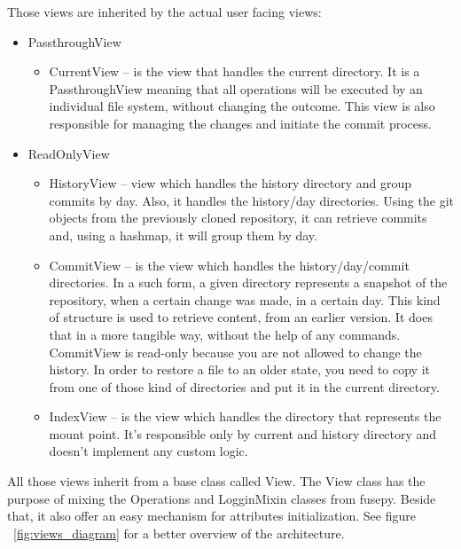 Those views are inherited by the actual user facing views:
\begin{itemize}
    \item PassthroughView
    \begin{itemize}
        \item CurrentView – is the view that handles the current directory. It is a PassthroughView meaning that all operations will be executed by an individual file system, without changing the outcome. This view is also responsible for managing the changes and initiate the commit process.
    \end{itemize}
    
    \item ReadOnlyView
    \begin{itemize}
        \item HistoryView – view which handles the history directory and group commits by day. Also, it handles the history/{day} directories. Using the git objects from the previously cloned repository, it can retrieve commits and, using a hashmap, it will group them by day.
        \item CommitView – is the view which handles the history/{day}/{commit} directories. In a such form, a given directory represents a snapshot of the repository, when a certain change was made, in a certain day. This kind of structure is used to retrieve content, from an earlier version. It does that in a more tangible way, without the help of any commands. CommitView is read-only because you are not allowed to change the history. In order to restore a file to an older state, you need to copy it from one of those kind of directories and put it in the current directory.
        \item IndexView – is the view which handles the directory that represents the mount point. It's responsible only by current and history directory and doesn't implement any custom logic.
    \end{itemize}
\end{itemize}

All those views inherit from a base class called View. The View class has the purpose of mixing the Operations and LogginMixin classes from fusepy. Beside that, it also offer an easy mechanism for attributes initialization. See figure ~\ref{fig:views_diagram} for a better overview of the architecture.

